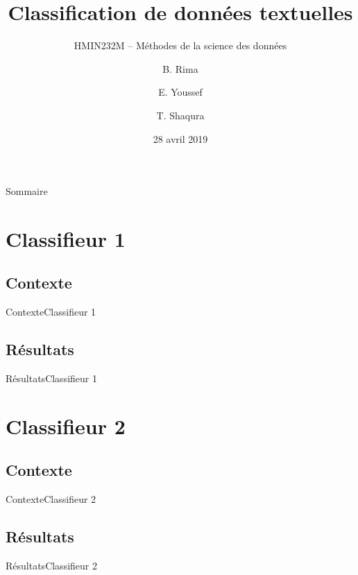 \documentclass[usenames,dvipsnames]{beamer}
\title{Classification de données textuelles}
\subtitle{HMIN232M -- Méthodes de la science des données}
\author{B. Rima \and E. Youssef \and T. Shaqura}
\institute[UM]{M1 Informatique AIGLE}
\date{28 avril 2019}
\begin{document}
\begin{frame}
\titlepage
\end{frame}
\begin{frame}{Sommaire}
\tableofcontents
\end{frame}
\section{Classifieur 1}
\subsection{Contexte}
\begin{frame}{Contexte}{Classifieur 1}
\end{frame}

\subsection{Résultats}
\begin{frame}{Résultats}{Classifieur 1}
\end{frame}

\section{Classifieur 2}
\subsection{Contexte}
\begin{frame}{Contexte}{Classifieur 2}
\end{frame}

\subsection{Résultats}
\begin{frame}{Résultats}{Classifieur 2}
\end{frame}
\end{document}
